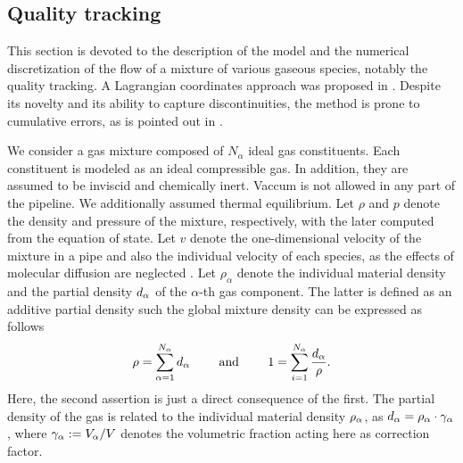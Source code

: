 \subsection{Quality tracking} \label{sec:quality_tracking}
This section is devoted to the description of the model and the numerical discretization of the flow of a mixture of various gaseous species, notably the quality tracking.  %
A Lagrangian coordinates approach was proposed in \cite{Chaczykowski2018}. Despite its novelty and its ability to capture discontinuities, the method is prone to cumulative errors, as is pointed out in \cite{Zhang2022}.

We consider a gas mixture composed of $N_\alpha$ ideal gas constituents. Each constituent is modeled as an ideal compressible gas. In addition, they are assumed to be inviscid and chemically inert. Vaccum is not allowed in any part of the pipeline. We additionally assumed thermal equilibrium.   Let $\rho$ and $p$ denote the density and pressure of the mixture, respectively, with the later computed from the equation of state. Let $v$ denote the one-dimensional velocity of the mixture in a pipe and also the individual velocity of each species, as the effects of molecular diffusion are neglected \cite{LarrouturouFezoui1989}. Let $\rho_\alpha$ denote the individual material density and the partial density $d_{\alpha}$ of the $\alpha$-th gas component. The latter is defined as an additive partial density such the global mixture density can be expressed as follows  
\[ 
 \rho=\sum_{\alpha =1}^{N_\alpha} d_{\alpha}  \qquad\text{ and }\qquad  1=\sum_{i=1}^{N_\alpha} \frac{d_{\alpha}}{\rho}. 
\]
Here, the second assertion is just a direct consequence of the first. The partial density of the gas is related to the individual material density ${\rho}_{\alpha}$, as $d_{\alpha} = {\rho}_{\alpha} \cdot \gamma_{\alpha}$, where $\gamma_{\alpha} := V_{\alpha}/V$ denotes the volumetric fraction acting here as correction factor. 

